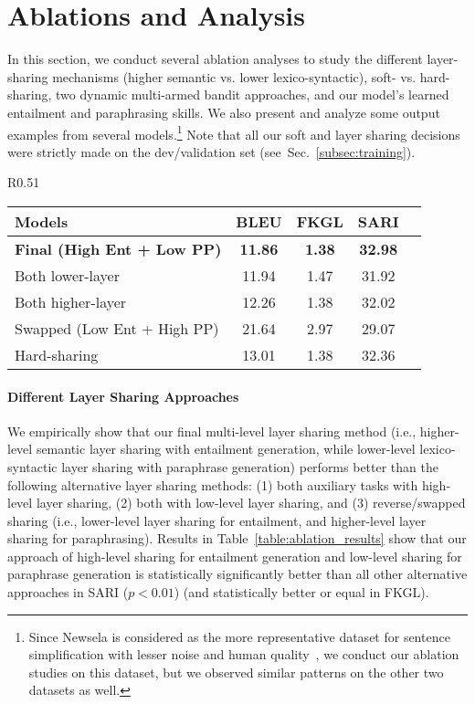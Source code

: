 \documentclass[11pt]{article}
\def\secref#1{Sec.~\ref{#1}}
\begin{document}
\section{Ablations and Analysis}
\label{sec:analysis}

In this section, we conduct several ablation analyses to study the different layer-sharing mechanisms (higher semantic vs. lower lexico-syntactic), soft- vs. hard-sharing, two dynamic multi-armed bandit approaches, and our model's learned entailment and paraphrasing skills. We also present and analyze some output examples from several models.\footnote{Since Newsela is considered as the more representative dataset for sentence simplification with lesser noise and human quality~\cite{xu2015problems,zhang2017dress}, we conduct our ablation studies on this dataset, but we observed similar patterns on the other two datasets as well.} Note that all our soft and layer sharing decisions were strictly made on the dev/validation set (see~\secref{subsec:training}).

\begin{wraptable}[7]{R}{0.51\textwidth}
    \vspace{-5pt}
\begin{small}
\begin{tabular}{|l|c|c|c|c|}
\hline
Models & BLEU & FKGL & SARI\\
\hline
\textbf{Final (High Ent + Low PP)} & \textbf{11.86} & \textbf{1.38} & 
\textbf{32.98} \\
\hline
Both lower-layer & 11.94 & 1.47 & 31.92 \\
Both higher-layer & 12.26 & 1.38 & 32.02 \\
Swapped (Low Ent + High PP) & 21.64 & 2.97 & 29.07 \\
\hline
Hard-sharing & 13.01 & 1.38 & 32.36 \\
\hline
\end{tabular}
\end{small}
\vspace{-12pt}
\caption{Multi-task layer ablation results on Newsela.}
\label{table:ablation_results}
\end{wraptable}

\paragraph{Different Layer Sharing Approaches}
We empirically show that our final multi-level layer sharing method (i.e., higher-level semantic layer sharing with entailment generation, while lower-level lexico-syntactic layer sharing with paraphrase generation) performs better than the following alternative layer sharing methods: (1) both auxiliary tasks with high-level layer sharing, (2) both with low-level layer sharing, and (3) reverse/swapped sharing (i.e., lower-level layer sharing for entailment, and higher-level layer sharing for paraphrasing). Results in Table~\ref{table:ablation_results} show that our approach of high-level sharing for entailment generation and low-level sharing for paraphrase generation is statistically significantly better than all other alternative approaches in SARI ($p<0.01$) (and statistically better or equal in FKGL).
\end{document}
